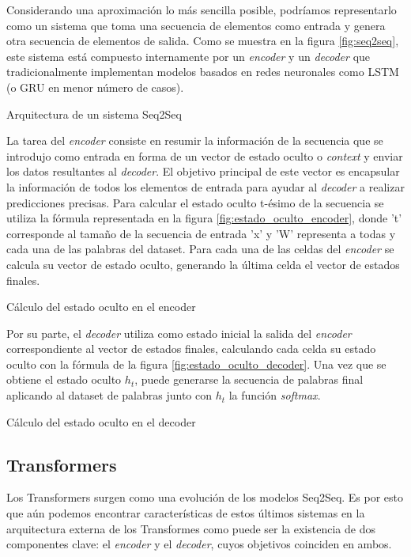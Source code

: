Considerando una aproximación lo más sencilla posible, podríamos representarlo como un sistema que toma una secuencia de elementos como entrada y genera otra secuencia de elementos de salida. Como se muestra en la figura \ref{fig:seq2seq}, este sistema está compuesto internamente por un \textit{encoder} y un \textit{decoder} que tradicionalmente implementan modelos basados en redes neuronales como LSTM (o GRU en menor número de casos). 

%
{Arquitectura de un sistema Seq2Seq}

La tarea del \textit{encoder} consiste en resumir la información de la secuencia que se introdujo como entrada en forma de un vector de estado oculto o \textit{context} y enviar los datos resultantes al \textit{decoder}. El objetivo principal de este vector es encapsular la información de todos los elementos de entrada para ayudar al \textit{decoder} a realizar predicciones precisas. Para calcular el estado oculto t-ésimo de la secuencia se utiliza la fórmula representada en la figura \ref{fig:estado_oculto_encoder}, donde 't' corresponde al tamaño de la secuencia de entrada 'x' y 'W' representa a todas y cada una de las palabras del dataset. Para cada una de las celdas del \textit{encoder} se calcula su vector de estado oculto, generando la última celda el vector de estados finales.

%
{Cálculo del estado oculto en el encoder}

Por su parte, el \textit{decoder} utiliza como estado inicial la salida del \textit{encoder} correspondiente al vector de estados finales, calculando cada celda su estado oculto con la fórmula de la figura \ref{fig:estado_oculto_decoder}. Una vez que se obtiene el estado oculto $h_{t}$, puede generarse la secuencia de palabras final aplicando al dataset de palabras junto con $h_{t}$ la función \textit{softmax}.

%
{Cálculo del estado oculto en el decoder}



\subsection{Transformers}
Los Transformers surgen como una evolución de los modelos Seq2Seq. Es por esto que aún podemos encontrar características de estos últimos sistemas en la arquitectura externa de los Transformes como puede ser la existencia de dos componentes clave: el \textit{encoder} y el \textit{decoder}, cuyos objetivos coinciden en ambos.

